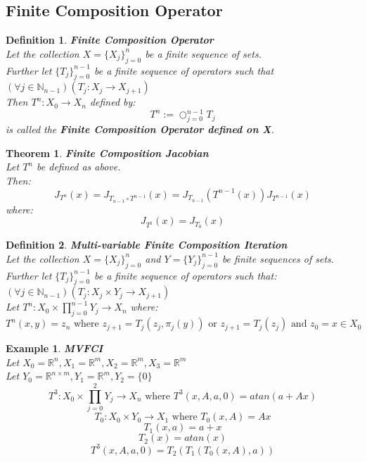 \documentclass[12pt]{extarticle}
\theoremstyle{plain}
\newtheorem{thm}{Theorem}[section]
\theoremstyle{Definition}
\newtheorem{def.}{Definition}[section]
\theoremstyle{Definition}
\theoremstyle{plain}
\newtheorem{exmp}{Example}[section]
\begin{document}
\subsection{Finite Composition Operator}
\begin{def.} \textbf{Finite Composition Operator} \\ 
	Let the collection $X = \{X_j\}_{j=0}^{n}$ be a finite sequence of sets. \\ 
	Further let $\{T_j\}_{j=0}^{n-1}$ be a finite sequence of operators such that $(\forall j \in \mathbb{N}_{n-1})(T_j : X_j \to X_{j+1})$ \\ 
	Then $T^n : X_0 \to X_{n}$ defined by: 
	$$T^n := \bigcirc_{j=0}^{n-1} T_j$$ 
	is called the \textbf{Finite Composition Operator defined on X}. \\ 
\end{def.}
\begin{thm} \textbf{Finite Composition Jacobian} \\ 
		Let $T^n$ be defined as above. \\ 
		Then: 
		$$J_{T^n}(x) = J_{T_{n-1} \circ T^{n-1}}(x) = J_{T_{n-1}}(T^{n-1}(x))J_{T^{n-1}}(x) $$
		where: 
		$$J_{T^1}(x) = J_{T_0}(x)$$	
\end{thm}
\begin{def.} \textbf{Multi-variable Finite Composition Iteration} \\ 
	Let the collection $X = \{X_j\}_{j=0}^n$ and $Y = \{Y_j\}_{j=0}^{n-1}$ be finite sequences of sets. \\ 
	Further let $\{T_j\}_{j=0}^{n-1}$ be a finite sequence of operators such that: $(\forall j \in \mathbb{N}_{n-1})(T_j : X_j \times Y_j \to X_{j+1})$ \\
	Let $T^n : X_0 \times \prod_{j=0}^{n-1}Y_j \to X_n$ where: \\ 
	$$T^n (x,y) = z_n \text{ where } z_{j+1} = T_j( z_{j},\pi_j (y) ) \text{ or } z_{j+1} = T_j( z_{j} )  \text{ and } z_0 = x \in X_0$$
\end{def.}
\begin{exmp} \textbf{MVFCI} \\ 
		Let $X_0 = \mathbb{R}^n, X_1 = \mathbb{R}^m, X_2 = \mathbb{R}^m, X_3 = \mathbb{R}^m$ \\
		Let $Y_0 = \mathbb{R}^{n\times m}, Y_1 = \mathbb{R}^m, Y_2 = \{0\}$
		$$T^3 : X_0 \times \prod_{j=0}^{2} Y_j \to X_n  \text{ where } T^3(x,A,a,0) = atan(a + Ax)$$ 
		$$T_0 : X_0 \times Y_0 \to X_1 \text{ where } T_0(x,A) = Ax$$ 
		$$T_1(x,a) = a+x$$ 
		$$T_2(x) = atan(x)$$ 
		$$T^3(x,A,a,0) = T_2(T_1(T_0(x,A),a) )$$ 
\end{exmp}
\end{document}
